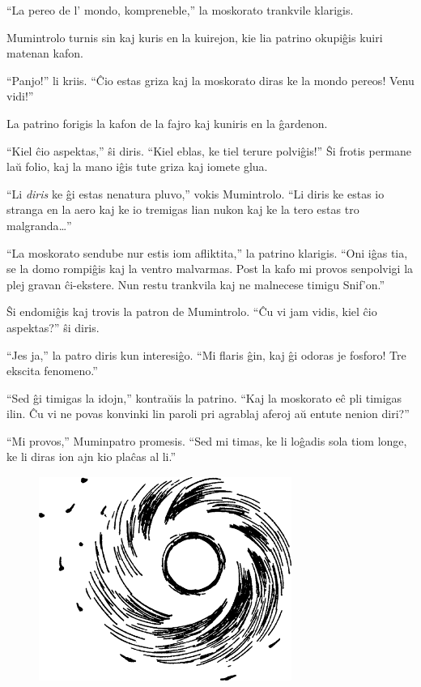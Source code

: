 ``La pereo de l' mondo, kompreneble,'' la moskorato trankvile klarigis.

Mumintrolo turnis sin kaj kuris en la kuirejon, kie lia patrino okupiĝis kuiri matenan kafon.

``Panjo!'' li kriis. ``Ĉio estas griza kaj la moskorato diras ke la mondo pereos! Venu vidi!''

La patrino forigis la kafon de la fajro kaj kuniris en la ĝardenon.

``Kiel ĉio aspektas,'' ŝi diris. ``Kiel eblas, ke tiel terure polviĝis!'' Ŝi frotis permane laŭ folio, kaj la mano iĝis tute griza kaj iomete glua.

``Li \emph{diris} ke ĝi estas nenatura pluvo,'' vokis Mumintrolo. ``Li diris ke estas io stranga en la aero kaj ke io tremigas lian nukon kaj ke la tero estas tro malgranda{\ldots}''

``La moskorato sendube nur estis iom afliktita,'' la patrino klarigis. ``Oni iĝas tia, se la domo rompiĝis kaj la ventro malvarmas. Post la kafo mi provos senpolvigi la plej gravan ĉi-ekstere. Nun restu trankvila kaj ne malnecese timigu Snif'on.''

Ŝi endomiĝis kaj trovis la patron de Mumintrolo. ``Ĉu vi jam vidis, kiel ĉio aspektas?'' ŝi diris.

``Jes ja,'' la patro diris kun interesiĝo. ``Mi flaris ĝin, kaj ĝi odoras je fosforo! Tre ekscita fenomeno.''

``Sed ĝi timigas la idojn,'' kontraŭis la patrino. ``Kaj la moskorato eĉ pli timigas ilin. Ĉu vi ne povas konvinki lin paroli pri agrablaj aferoj aŭ entute nenion diri?''

``Mi provos,'' Muminpatro promesis. ``Sed mi timas, ke li loĝadis sola tiom longe, ke li diras ion ajn kio plaĉas al li.''

\begin{figure}[htbp]
\centering
\includegraphics[width=234pt,height=190pt]{2-2.png}
\caption{}
\label{2-2}
\end{figure}

